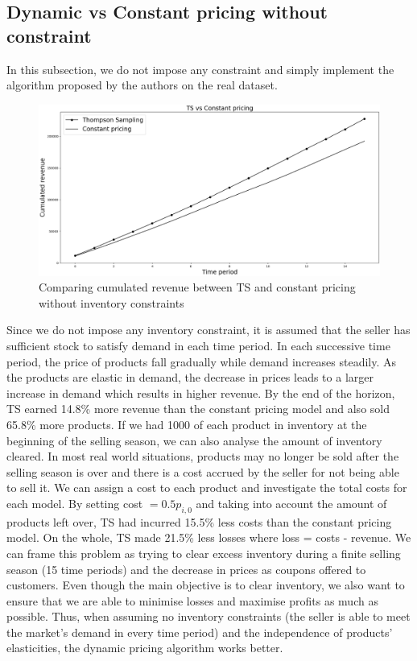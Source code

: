 \documentclass[a4paper]{article}
\begin{document}
\subsection{Dynamic vs Constant pricing without constraint}
In this subsection, we do not impose any constraint and simply implement the algorithm proposed by the authors on the real dataset.
\begin{figure}[h]
	\centering
	\includegraphics[width=1\textwidth]{Figure_2-1.png}
	\caption{\label{fig:four}Comparing cumulated revenue between TS and constant pricing without inventory constraints}
\end{figure}
\newline
Since we do not impose any inventory constraint, it is assumed that the seller has sufficient stock to satisfy demand in each time period. In each successive time period, the price of products fall gradually while demand increases steadily. As the products are elastic in demand, the decrease in prices leads to a larger increase in demand which results in higher revenue.
\newline
\newline
By the end of the horizon, TS earned 14.8\% more revenue than the constant pricing model and also sold 65.8\% more products. If we had 1000 of each product in inventory at the beginning of the selling season, we can also analyse the amount of inventory cleared. In most real world situations, products may no longer be sold after the selling season is over and there is a cost accrued by the seller for not being able to sell it. We can assign a cost to each product and investigate the total costs for each model. By setting cost $= 0.5  p_{i,0}$ and taking into account the amount of products left over, TS had incurred 15.5\% less costs than the constant pricing model. On the whole, TS made 21.5\% less losses where loss = costs - revenue.
\newline
\newline
We can frame this problem as trying to clear excess inventory during a finite selling season (15 time periods) and the decrease in prices as coupons offered to customers. Even though the main objective is to clear inventory, we also want to ensure that we are able to minimise losses and maximise profits as much as possible. Thus, when assuming no inventory constraints (the seller is able to meet the market's demand in every time period) and the independence of products' elasticities, the dynamic pricing algorithm works better.
\end{document}
